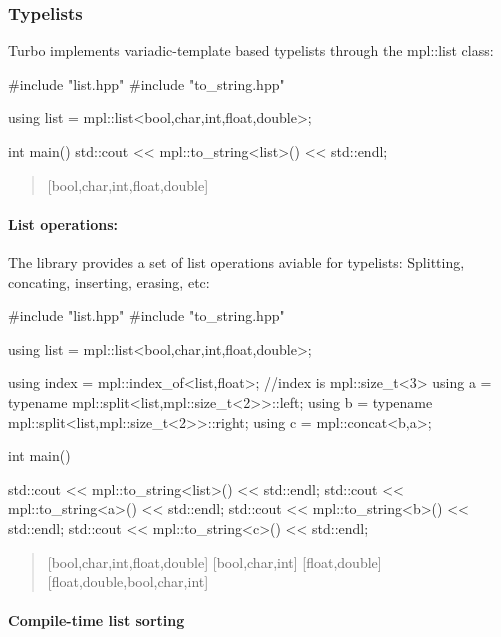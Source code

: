 \subsubsection*{Typelists}

Turbo implements variadic-\/template based typelists through the {\ttfamily mpl\+::list} class\+: \begin{DoxyVerb}#include "list.hpp"
#include "to_string.hpp"

using list = mpl::list<bool,char,int,float,double>;

int main()
{
  std::cout << mpl::to_string<list>() << std::endl;
}
\end{DoxyVerb}
 \begin{quote}
\mbox{[}bool,char,int,float,double\mbox{]} \end{quote}


\paragraph*{List operations\+:}

The library provides a set of list operations aviable for typelists\+: Splitting, concating, inserting, erasing, etc\+: \begin{DoxyVerb}#include "list.hpp"
#include "to_string.hpp"

using list = mpl::list<bool,char,int,float,double>;

using index = mpl::index_of<list,float>; //index is mpl::size_t<3>
using a = typename mpl::split<list,mpl::size_t<2>>::left;
using b = typename mpl::split<list,mpl::size_t<2>>::right;
using c = mpl::concat<b,a>;



int main()
{
  std::cout << mpl::to_string<list>() << std::endl;
  std::cout << mpl::to_string<a>() << std::endl;
  std::cout << mpl::to_string<b>() << std::endl;
  std::cout << mpl::to_string<c>() << std::endl;

}
\end{DoxyVerb}
 \begin{quote}
\mbox{[}bool,char,int,float,double\mbox{]} \mbox{[}bool,char,int\mbox{]} \mbox{[}float,double\mbox{]} \mbox{[}float,double,bool,char,int\mbox{]} \end{quote}


\paragraph*{Compile-\/time list sorting}

